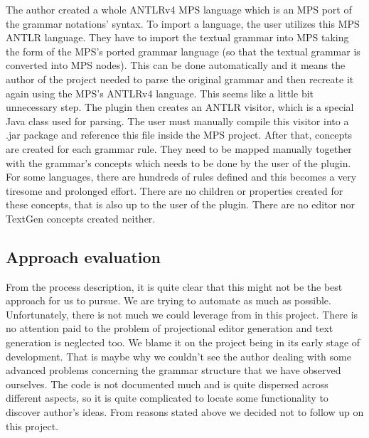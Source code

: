 The author created a whole ANTLRv4 MPS language which is an MPS port of the grammar notations' syntax.
To import a language, the user utilizes this MPS ANTLR language.
They have to import the textual grammar into MPS taking the form of the MPS's ported grammar language (so that the textual grammar is converted into MPS nodes).
This can be done automatically and it means the author of the project needed to parse the original grammar and then recreate it again using the MPS's ANTLRv4 language.
This seems like a little bit unnecessary step.
The plugin then creates an ANTLR visitor, which is a special Java class used for parsing.
The user must manually compile this visitor into a .jar package and reference this file inside the MPS project.
After that, concepts are created for each grammar rule.
They need to be mapped manually together with the grammar's concepts which needs to be done by the user of the plugin.
For some languages, there are hundreds of rules defined and this becomes a very tiresome and prolonged effort.
There are no children or properties created for these concepts, that is also up to the user of the plugin.
There are no editor nor TextGen concepts created neither.

\subsection{Approach evaluation}
From the process description, it is quite clear that this might not be the best approach for us to pursue.
We are trying to automate as much as possible.
Unfortunately, there is not much we could leverage from in this project.
There is no attention paid to the problem of projectional editor generation and text generation is neglected too.
We blame it on the project being in its early stage of development.
That is maybe why we couldn't see the author dealing with some advanced problems concerning the grammar structure that we have observed ourselves.
The code is not documented much and is quite dispersed across different aspects, so it is quite complicated to locate some functionality to discover author's ideas.
From reasons stated above we decided not to follow up on this project.

